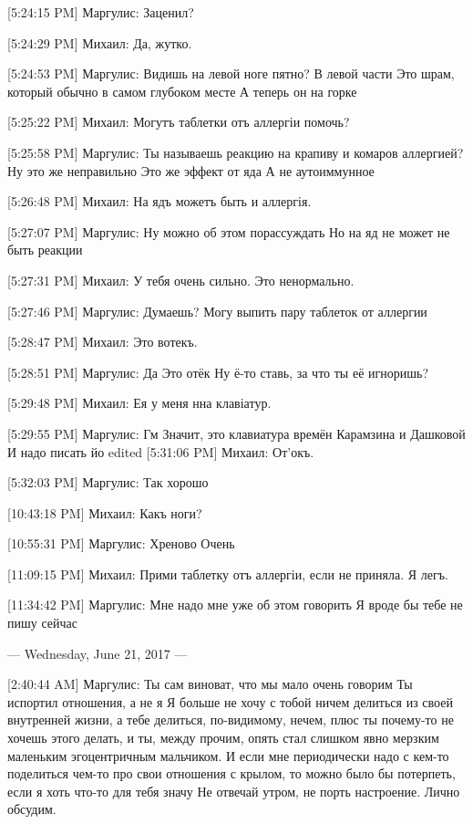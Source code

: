 \documentclass{article}
\newcommand{\yat}{{\fontencoding{X2}\selectfont\cyryat}} %
\begin{document}
[5:24:15 PM] Маргулис:
Заценил?

[5:24:29 PM] Михаил:
Да, жутко.

[5:24:53 PM] Маргулис:
Видишь на левой ноге пятно?
 В левой части
 Это шрам, который обычно в самом глубоком месте
 А теперь он на горке

[5:25:22 PM] Михаил:
Могутъ таблетки отъ аллергіи помочь?

[5:25:58 PM] Маргулис:
Ты называешь реакцию на крапиву и комаров аллергией?
 Ну это же неправильно
 Это же эффект от яда
 А не аутоиммунное

[5:26:48 PM] Михаил:
На ядъ можетъ быть и аллергія.

[5:27:07 PM] Маргулис:
Ну можно об этом порассуждать
 Но на яд не может не быть реакции

[5:27:31 PM] Михаил:
У тебя очень сильно. Это ненормально.

[5:27:46 PM] Маргулис:
Думаешь?
 Могу выпить пару таблеток от аллергии

[5:28:47 PM] Михаил:
Это в отекъ.

[5:28:51 PM] Маргулис:
Да
 Это отёк
 Ну ё-то ставь, за что ты её игноришь?

[5:29:48 PM] Михаил:
Ея у меня н на клавіатур\yat.

[5:29:55 PM] Маргулис:
Гм
 Значит, это клавиатура времён Карамзина и Дашковой
 И надо писать йо
edited 
[5:31:06 PM] Михаил:
От'окъ.

[5:32:03 PM] Маргулис:
Так хорошо

[10:43:18 PM] Михаил:
Какъ ноги?

[10:55:31 PM] Маргулис:
Хреново
 Очень

[11:09:15 PM] Михаил:
Прими таблетку отъ аллергіи, если не приняла.
 Я легъ.

[11:34:42 PM] Маргулис:
Мне надо мне уже об этом говорить
 Я вроде бы тебе не пишу сейчас

--- Wednesday, June 21, 2017 ---

[2:40:44 AM] Маргулис:
Ты сам виноват, что мы мало очень говорим
 Ты испортил отношения, а не я
 Я больше не хочу с тобой ничем делиться из своей внутренней жизни, а тебе делиться, по-видимому, нечем, плюс ты почему-то не хочешь этого делать, и ты, между прочим, опять стал слишком явно мерзким маленьким эгоцентричным мальчиком.
 И если мне периодически надо с кем-то поделиться чем-то про свои отношения с крылом, то можно было бы потерпеть, если я хоть что-то для тебя значу
 Не отвечай утром, не порть настроение. Лично обсудим.
\end{document}
